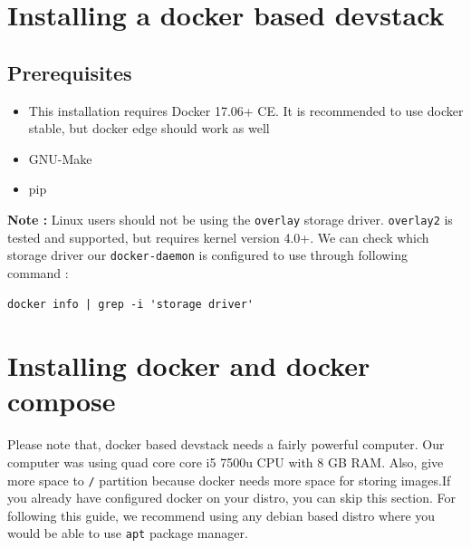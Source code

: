 \section{Installing a docker based devstack}

\subsection{Prerequisites}
\begin{itemize}
	\item This installation requires Docker 17.06+ CE. It is recommended to use docker stable, but docker edge should work as well
	\item GNU-Make
	\item pip
\end{itemize}
\textbf{Note : }\newline
Linux users should not be using the \verb|overlay| storage driver. \verb|overlay2| is tested and supported, but requires kernel version 4.0+. We can check which storage driver our \verb|docker-daemon| is configured to use through following command : \newline
\begin{center}{\verb=docker info | grep -i 'storage driver'=}\end{center}

\section{Installing docker and docker compose}
Please note that, docker based devstack needs a fairly powerful computer. Our computer was using quad core core i5 7500u CPU with 8 GB RAM. Also, give more space to \verb=/= partition because docker needs more space for storing images.If you already have configured docker on your distro, you can skip this section. For following this guide, we recommend using any debian based distro where you would be able to use \verb=apt= package manager. 

